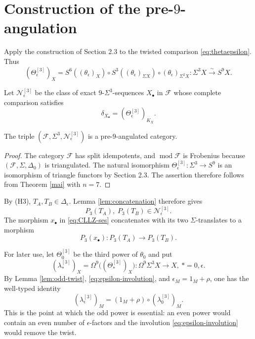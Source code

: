 \documentclass[12pt, twoside]{article}
\numberwithin{equation}{section}
\begin{document}
\section{Construction of the pre-$9$-angulation}

Apply the construction of Section 2.3 to the twisted comparison \eqref{eq:thetaepsilon}. Thus
\begin{equation*}
(\Theta_\epsilon^{[3]})_X
=S^6((\theta_\epsilon)_X)\circ
S^3((\theta_\epsilon)_{\Sigma X})\circ
(\theta_\epsilon)_{\Sigma^2X}:
\Sigma^3X\xrightarrow{\sim}S^9X.
\end{equation*}

\begin{construction}\label{cons}
Let $\mathcal N_\epsilon^{[3]}$ be the class of exact $9$-$\Sigma^3$-sequences $X_\bullet$ in $\mathcal F$ whose complete comparison satisfies
\[
\delta_{X_\bullet}=(\Theta_\epsilon^{[3]})_{K_X}.
\]
\end{construction}

\begin{proposition}\label{pre1}\rm
The triple $(\mathcal F,\Sigma^3,\mathcal N_\epsilon^{[3]})$ is a pre-$9$-angulated category.
\end{proposition}

\begin{proof}
The category $\mathcal F$ has split idempotents, and $\operatorname{mod}\mathcal F$ is Frobenius because $(\mathcal F,\Sigma,\Delta_0)$ is triangulated. The natural isomorphism $\Theta_\epsilon^{[3]}:\Sigma^3\to S^9$ is an isomorphism of triangle functors by Section 2.3. The assertion therefore follows from Theorem \ref{mai} with $n=7$.
\end{proof}

By (H3), $T_A,T_B\in\Delta_\epsilon$. Lemma \ref{lem:concatenation} therefore gives
\begin{equation}\label{eq:P3AB}
P_3(T_A),\;P_3(T_B)\in\mathcal N_\epsilon^{[3]}.
\end{equation}
The morphism $x_\bullet$ in \eqref{eq:CLLZ-ses} concatenates with its two $\Sigma$-translates to a morphism
\begin{equation}\label{eq:P3x}
P_3(x_\bullet):P_3(T_A)\longrightarrow P_3(T_B).
\end{equation}

For later use, let $\Theta_0^{[3]}$ be the third power of $\theta_0$ and put
\[
(\lambda_*^{[3]})_X
=\Omega^9\bigl((\Theta_*^{[3]})_X\bigr):
\Omega^9\Sigma^3X\longrightarrow X,
~*=0,\epsilon.
\]
By Lemma \ref{lem:odd-twist}, \eqref{eq:epsilon-involution}, and $\epsilon_M=1_M+\rho$, one has the well-typed identity
\begin{equation}\label{eq:obstruction}
(\lambda_\epsilon^{[3]})_M
=(1_M+\rho)\circ(\lambda_0^{[3]})_M.
\end{equation}
This is the point at which the odd power is essential: an even power would contain an even number of $\epsilon$-factors and the involution \eqref{eq:epsilon-involution} would remove the twist.
\end{document}
